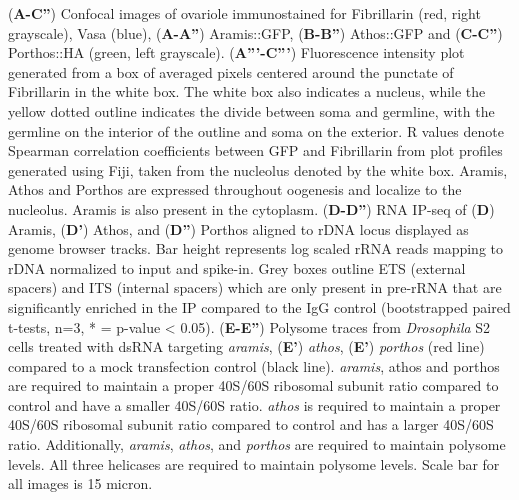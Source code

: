 \documentclass[12pt,oneside]{reedthesis}
\begin{document}
\setlength\parindent{0pt}(\textbf{A-C''}) Confocal images of ovariole immunostained for Fibrillarin (red, right grayscale), Vasa (blue), (\textbf{A-A''}) Aramis::GFP, (\textbf{B-B''}) Athos::GFP and (\textbf{C-C''}) Porthos::HA (green, left grayscale). (\textbf{A'''-C'''}) Fluorescence intensity plot generated from a box of averaged pixels centered around the punctate of Fibrillarin in the white box. The white box also indicates a nucleus, while the yellow dotted outline indicates the divide between soma and germline, with the germline on the interior of the outline and soma on the exterior. R values denote Spearman correlation coefficients between GFP and Fibrillarin from plot profiles generated using Fiji, taken from the nucleolus denoted by the white box. Aramis, Athos and Porthos are expressed throughout oogenesis and localize to the nucleolus. Aramis is also present in the cytoplasm. (\textbf{D-D''}) RNA IP-seq of (\textbf{D}) Aramis, (\textbf{D'}) Athos, and (\textbf{D''}) Porthos aligned to rDNA locus displayed as genome browser tracks. Bar height represents log scaled rRNA reads mapping to rDNA normalized to input and spike-in. Grey boxes outline ETS (external spacers) and ITS (internal spacers) which are only present in pre-rRNA that are significantly enriched in the IP compared to the IgG control (bootstrapped paired t-tests, n=3, * = p-value \textless{} 0.05). (\textbf{E-E''}) Polysome traces from \emph{Drosophila} S2 cells treated with dsRNA targeting \emph{aramis}, (\textbf{E'}) \emph{athos}, (\textbf{E'}) \emph{porthos} (red line) compared to a mock transfection control (black line). \emph{aramis}, athos and porthos are required to maintain a proper 40S/60S ribosomal subunit ratio compared to control and have a smaller 40S/60S ratio. \emph{athos} is required to maintain a proper 40S/60S ribosomal subunit ratio compared to control and has a larger 40S/60S ratio. Additionally, \emph{aramis}, \emph{athos}, and \emph{porthos} are required to maintain polysome levels. All three helicases are required to maintain polysome levels. Scale bar for all images is 15 micron.


\textbf{\hfill\break
}
\end{document}
